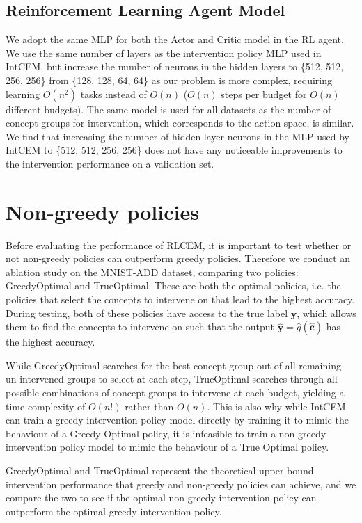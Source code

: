 \subsection{Reinforcement Learning Agent Model}
We adopt the same MLP for 
both the Actor and Critic model in the RL agent. 
We use the same number of layers as the intervention policy
 MLP used in IntCEM, but increase the number of neurons in the hidden layers
 to \{512, 512, 256, 256\} from \{128, 128, 64, 64\} as
 our problem is more complex, requiring 
 learning $O(n^2)$ tasks instead of $O(n)$ ($O(n)$ 
steps per budget for $O(n)$ different budgets).
 The same model is used
 for all datasets as the number of concept groups for intervention,
 which corresponds to the action space,
 is similar. We find that increasing the number of hidden layer neurons
 in the MLP used by 
 IntCEM to \{512, 512, 256, 256\} does not have any noticeable improvements
 to the intervention performance
 on a validation set.
    
\section{Non-greedy policies}

Before evaluating the performance of RLCEM, it is important to test whether or not 
non-greedy policies can outperform greedy policies. 
Therefore we conduct an
ablation study on the MNIST-ADD dataset, comparing two policies:
GreedyOptimal and TrueOptimal.
These are both the optimal policies,
i.e. the policies that select the concepts to intervene
on that lead to the highest accuracy. During 
testing, both of these policies have access to the true label $\mathbf{y}$, which 
allows them to find the concepts to intervene on 
such that the output
$\hat{\mathbf{y}} = \hat{g}(\hat{\mathbf{c}})$ 
has the highest accuracy.

While GreedyOptimal searches for the best concept group
out of all remaining un-intervened groups
to select at each step, TrueOptimal searches through
all possible combinations of concept groups to intervene at each budget, yielding
a time complexity of $O(n!)$ rather than
$O(n)$. This is also why while IntCEM can 
train a greedy intervention policy model directly
by training it to mimic the behaviour of a Greedy Optimal 
policy, it is infeasible to train a non-greedy intervention policy
model to mimic the behaviour of a True Optimal policy.

GreedyOptimal and TrueOptimal represent the theoretical
upper bound intervention performance
that greedy and non-greedy policies can achieve,
and we compare the two to see if the optimal 
non-greedy intervention policy can outperform the 
optimal greedy
intervention policy.

